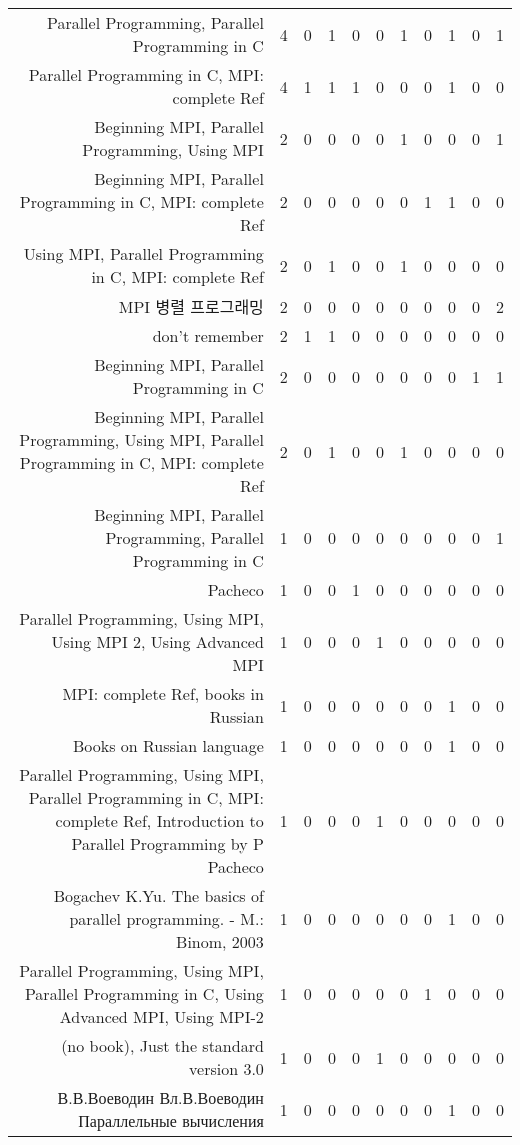{\begin{landscape}
\begin{longtable}[htb]{r|c|c|c|c|c|c|c|c|c|c}
{Parallel Programming, Parallel Programming in C} & 4 & 0 & 1 & 0 & 0 & 1 & 0 & 1 & 0 & 1 \\%
{Parallel Programming in C, MPI: complete Ref} & 4 & 1 & 1 & 1 & 0 & 0 & 0 & 1 & 0 & 0 \\%
{Beginning MPI, Parallel Programming, Using MPI} & 2 & 0 & 0 & 0 & 0 & 1 & 0 & 0 & 0 & 1 \\%
{Beginning MPI, Parallel Programming in C, MPI: complete Ref} & 2 & 0 & 0 & 0 & 0 & 0 & 1 & 1 & 0 & 0 \\%
{Using MPI, Parallel Programming in C, MPI: complete Ref} & 2 & 0 & 1 & 0 & 0 & 1 & 0 & 0 & 0 & 0 \\%
{MPI 병렬 프로그래밍} & 2 & 0 & 0 & 0 & 0 & 0 & 0 & 0 & 0 & 2 \\%
{don't remember} & 2 & 1 & 1 & 0 & 0 & 0 & 0 & 0 & 0 & 0 \\%
{Beginning MPI, Parallel Programming in C} & 2 & 0 & 0 & 0 & 0 & 0 & 0 & 0 & 1 & 1 \\%
{Beginning MPI, Parallel Programming, Using MPI, Parallel Programming in C, MPI: complete Ref} & 2 & 0 & 1 & 0 & 0 & 1 & 0 & 0 & 0 & 0 \\%
{Beginning MPI, Parallel Programming, Parallel Programming in C} & 1 & 0 & 0 & 0 & 0 & 0 & 0 & 0 & 0 & 1 \\%
{Pacheco} & 1 & 0 & 0 & 1 & 0 & 0 & 0 & 0 & 0 & 0 \\%
{Parallel Programming, Using MPI, Using MPI 2, Using Advanced MPI} & 1 & 0 & 0 & 0 & 1 & 0 & 0 & 0 & 0 & 0 \\%
{MPI: complete Ref, books in Russian} & 1 & 0 & 0 & 0 & 0 & 0 & 0 & 1 & 0 & 0 \\%
{Books on Russian language} & 1 & 0 & 0 & 0 & 0 & 0 & 0 & 1 & 0 & 0 \\%
{Parallel Programming, Using MPI, Parallel Programming in C, MPI: complete Ref, Introduction to Parallel Programming by P Pacheco} & 1 & 0 & 0 & 0 & 1 & 0 & 0 & 0 & 0 & 0 \\%
{Bogachev K.Yu. The basics of parallel programming. - M.: Binom, 2003} & 1 & 0 & 0 & 0 & 0 & 0 & 0 & 1 & 0 & 0 \\%
{Parallel Programming, Using MPI, Parallel Programming in C, Using Advanced MPI, Using MPI-2} & 1 & 0 & 0 & 0 & 0 & 0 & 1 & 0 & 0 & 0 \\%
{(no book), Just the standard version 3.0} & 1 & 0 & 0 & 0 & 1 & 0 & 0 & 0 & 0 & 0 \\%
{В.В.Воеводин Вл.В.Воеводин Параллельные вычисления} & 1 & 0 & 0 & 0 & 0 & 0 & 0 & 1 & 0 & 0 \\%

\end{longtable}
\end{landscape}}
